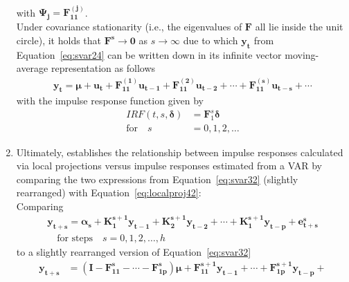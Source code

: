 \documentclass[a4paper,11pt,listof=nochaptergap,oneside,pointednumbers,bibtotoc,bigheadings,liststotoc]{scrbook}
\theoremstyle{mysatz}
\theoremstyle{mydefinition}
\theoremstyle{mybemerkung}
\newcommand{\vect}[1]{\boldsymbol{\mathbf{#1}}}
\begin{document}
\begin{enumerate}
\begin{equation}
\begin{split}
	\end{split}								
	\end{equation}		
	with $\vect{\Psi_j} = \vect{F_{11}^{(j)}}$. \\
	Under covariance stationarity (i.e., the eigenvalues of $\vect{F}$ all lie inside the unit circle), it holds that $\vect{F^s} \to \vect{0}$ as $s \to \infty$ due to which $\vect{y_t}$ from Equation~\ref{eq:svar24} can be written down in its infinite vector moving-average representation as follows
	\begin{equation} \label{eq:svar33}
	\begin{split}
		\vect{y_t} = \vect{\mu} + \vect{u_t} + \vect{F_{11}^{(1)}}\vect{u_{t-1}} + \vect{F_{11}^{(2)}}\vect{u_{t-2}} + \cdots +  \vect{F_{11}^{(s)}}\vect{u_{t-s}} + \cdots
	\end{split}								
	\end{equation}	
	with the impulse response function given by
	\begin{equation}\label{eq:svar33a}
\begin{split}
	IRF(t, s, \vect{\delta}) & = {\vect{F}_1^s}\vect{\delta}  \\
	\text{for} \quad s & = 0, 1, 2, \dots
\end{split}
\end{equation}
	\item Ultimately, \citet{jorda:05} establishes the relationship between impulse responses calculated via local projections versus impulse responses estimated from a VAR by comparing the two expressions from Equation~\ref{eq:svar32} (slightly rearranged) with Equation~\ref{eq:localproj42}: \\Comparing
		\begin{equation} \label{eq:svar34}
	\begin{split}
		\vect{y_{t+s}} = \vect{\alpha_s} + \vect{K_1^{s+1}}\vect{y_{t-1}} + \vect{K_2^{s+1}}\vect{y_{t-2}} + \cdots + \vect{K_1^{s+1}}\vect{y_{t-p}} + \vect{e_{t+s}^s}\\
	\quad \text{for steps} \quad s=0, 1, 2, \dots, h 
	\end{split}								
	\end{equation}	
	to a slightly rearranged version of Equation~\ref{eq:svar32}
	\begin{equation} \label{eq:svar35}
	\begin{split}
		\vect{y_{t+s}} & = (\vect{I} - \vect{F_{11}^s} - \cdots - \vect{F_{1p}^s})\vect{\mu} + \vect{F_{11}^{s+1}}\vect{y_{t-1}} + \cdots + \vect{F_{1p}^{s+1}}\vect{y_{t-p}} + \\

\end{split}
\end{equation}
\end{enumerate}
\end{document}
